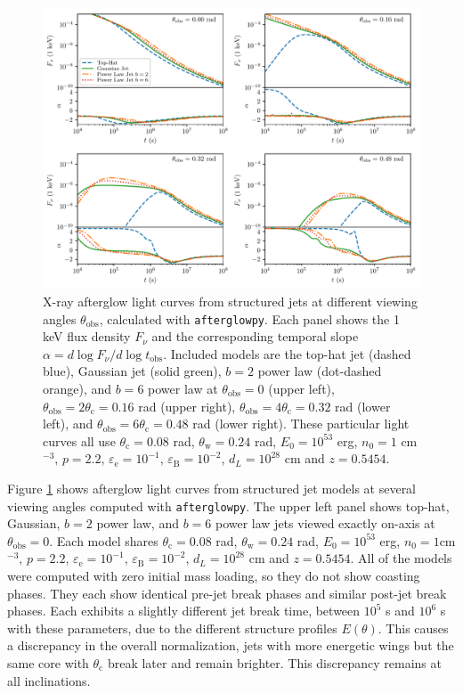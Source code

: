 \documentclass[twocolumn]{aastex62}
\newcommand{\afterglowpy}{{\tt afterglowpy}}
\newcommand{\tobs}{\ensuremath{t_{\mathrm{obs}}}}
\newcommand{\thobs}{\ensuremath{\theta_{\mathrm{obs}}}}
\newcommand{\thW}{\ensuremath{\theta_{\mathrm{w}}}}
\newcommand{\thC}{\ensuremath{\theta_{\mathrm{c}}}}
\newcommand{\epse}{\ensuremath{\varepsilon_{\mathrm{e}}}}
\newcommand{\epsB}{\ensuremath{\varepsilon_{\mathrm{B}}}}
\begin{document}
\begin{figure}
	\includegraphics[width=\textwidth]{figs/lc_thV_model_multi.pdf}
	\caption{X-ray afterglow light curves from structured jets at different viewing angles $\thobs$, calculated with \afterglowpy{}.  Each panel shows the 1 keV flux density $F_\nu$ and the corresponding temporal slope $\alpha = d\log F_\nu / d\log \tobs$.  Included models are the top-hat jet (dashed blue), Gaussian jet (solid green), $b=2$ power law (dot-dashed orange), and $b=6$ power law at $\thobs=0$ (upper left), $\thobs=2\thC=0.16$ rad (upper right), $\thobs=4\thC=0.32$ rad (lower left), and $\thobs=6\thC=0.48$ rad (lower right). These particular light curves all use $\thC = 0.08$ rad, $\thW = 0.24$ rad, $E_0 = 10^{53}$ erg, $n_0=1$ cm$^{-3}$, $p=2.2$, $\epse = 10^{-1}$, $\epsB = 10^{-2}$, $d_L=10^{28}$ cm and $z=0.5454$. \label{fig:thVmodel}}
\end{figure}

Figure \ref{fig:thVmodel} shows afterglow light curves from structured jet models at several viewing angles computed with \afterglowpy{}.  The upper left panel shows top-hat, Gaussian, $b=2$ power law, and $b=6$ power law jets viewed exactly on-axis at $\thobs=0$.  Each model shares $\thC=0.08$ rad, $\thW=0.24$ rad, $E_0=10^{53}$ erg, $n_0 = 1$cm$^{-3}$, $p=2.2$, $\epse=10^{-1}$, $\epsB = 10^{-2}$, $d_L=10^{28}$ cm and $z=0.5454$.  All of the models were computed with zero initial mass loading, so they do not show coasting phases.  They each show identical pre-jet break phases and similar post-jet break phases.  Each exhibits a slightly different jet break time, between $10^5$ s and $10^6$ s with these parameters, due to the different structure profiles $E(\theta)$.  This causes a discrepancy in the overall normalization, jets with more energetic wings but the same core with $\thC$ break later and remain brighter.  This discrepancy remains at all inclinations.
\end{document}
